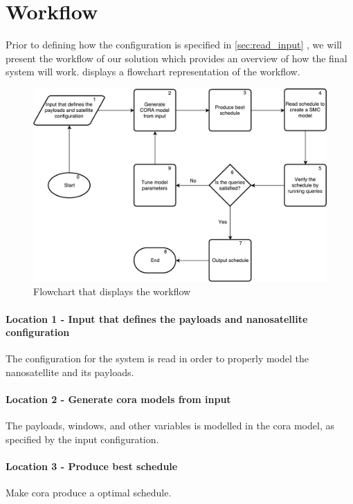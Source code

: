 \section{Workflow} \label{subsec:tool_chainv}
Prior to defining how the configuration is specified in \cref{sec:read_input} , we will present the workflow of our solution which provides an overview of how the final system will work.
 displays a flowchart representation of the workflow.

\begin{figure}[h]
	\includegraphics[width=\textwidth]{graphics/flow_final.pdf}
	\caption{Flowchart that displays the workflow}
	\label{fig:tool1}
\end{figure}

\paragraph{Location 1 - Input that defines the payloads and nanosatellite configuration} 
The configuration for the system is read in order to properly model the nanosatellite and its payloads.

\paragraph{Location 2 - Generate \gls{cora} models from input} 
The payloads, windows, and other variables is modelled in the \gls{cora} model, as specified by the input configuration.

\paragraph{Location 3 - Produce best schedule} 
Make \gls{cora}  produce a optimal schedule.

